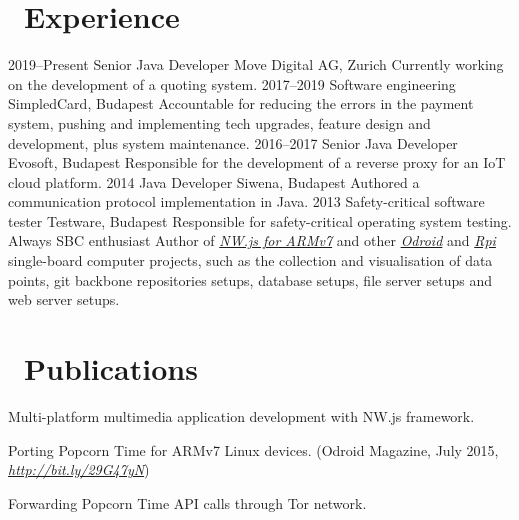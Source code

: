 \documentclass[hidelinks,11pt]{friggeri-cv}
\def\book{{\FA \faBook}}
\def\suitcase{{\FA \faSuitcase}}
\begin{document}
\section{{\suitcase}\ Experience}
\begin{entrylist}
    \entry
    {2019--Present}
    {Senior Java Developer}
    {Move Digital AG, Zurich}
    {Currently working on the development of a quoting system.}
    \entry
    {2017--2019}
    {Software engineering}
    {SimpledCard, Budapest}
    {Accountable for reducing the errors in the payment system, pushing and implementing tech upgrades, feature design and development, plus system maintenance.}
    \entry
    {2016--2017}
    {Senior Java Developer}
    {Evosoft, Budapest}
    {Responsible for the development of a reverse proxy for an IoT cloud platform.}
    \entry
    {2014}
    {Java Developer}
    {Siwena, Budapest}
    {Authored a communication protocol implementation in Java.}
    \entry
    {2013}
    {Safety-critical software tester}
    {Testware, Budapest}
    {Responsible for safety-critical operating system testing.}
    \entry
    {Always}
    {SBC enthusiast}
    {}
    {Author of \textit{\href{https://github.com/LeonardLaszlo/nw.js-armv7-binaries}{NW.js for ARMv7}} and other \textit{\href{http://www.hardkernel.com/main/main.php}{Odroid}} and \textit{\href{https://www.raspberrypi.org}{Rpi}} single-board computer projects, such as the collection and visualisation of data points, git backbone repositories setups, database setups, file server setups and web server setups.}
\end{entrylist}

\section{{\book}\ Publications}
Multi-platform multimedia application development with NW.js framework.

Porting Popcorn Time for ARMv7 Linux devices.
{\small (Odroid Magazine, July 2015, \textit{\href{http://bit.ly/29G47yN}{http://bit.ly/29G47yN}})}

Forwarding Popcorn Time API calls through Tor network.
\end{document}
